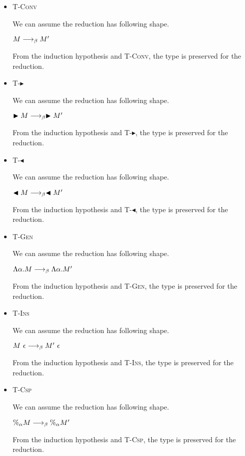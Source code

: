 \documentclass[9pt, a4paper]{extarticle}
\theoremstyle{break}
\newcommand{\TB}{\blacktriangleright}
\newcommand{\TBL}{\blacktriangleleft}
\newcommand{\TAbs}{\textsc{T-Abs}}
\newcommand{\TConv}{\textsc{T-Conv}}
\newcommand{\TTB}{\textsc{T-$\TB$}}
\newcommand{\TTBL}{\textsc{T-$\TBL$}}
\newcommand{\TGen}{\textsc{T-Gen}}
\newcommand{\TIns}{\textsc{T-Ins}}
\newcommand{\TCsp}{\textsc{T-Csp}}
\begin{document}
\begin{itemize}
	      From the induction hypothesis and \TAbs, the type is preserved for the reduction.


	\item \TConv

	      We can assume the reduction has following shape.

	      $M \longrightarrow_{\beta} M'$

	      From the induction hypothesis and \TConv, the type is preserved for the reduction.

	\item \TTB

	      We can assume the reduction has following shape.

	      $\TB M \LB \TB M'$

	      From the induction hypothesis and \TTB, the type is preserved for the reduction.

	\item \TTBL

	      We can assume the reduction has following shape.

	      $\TBL M \LB \TBL M'$

	      From the induction hypothesis and \TTBL, the type is preserved for the reduction.

	\item \TGen

	      We can assume the reduction has following shape.

	      $\Lambda\alpha. M \longrightarrow_{\beta} \Lambda\alpha. M'$

	      From the induction hypothesis and \TGen, the type is preserved for the reduction.

	\item \TIns

	      We can assume the reduction has following shape.

	      $M\ \epsilon \longrightarrow_{\beta} M'\ \epsilon$

	      From the induction hypothesis and \TIns, the type is preserved for the reduction.

	\item \TCsp

	      We can assume the reduction has following shape.

	      $\%_\alpha M \longrightarrow_{\beta} \%_\alpha M'$

	      From the induction hypothesis and \TCsp, the type is preserved for the reduction.

	      \fi

\end{itemize}
\end{document}
